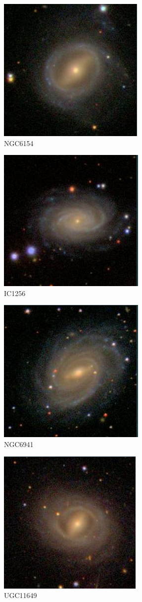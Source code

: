 \documentclass[9pt]{revtex4-1}
\begin{document}
\begin{figure}
\includegraphics[scale=0.3]{NGC6154.png}
\caption{NGC6154}
\end{figure}
\begin{figure}
\includegraphics[scale=0.3]{IC1256.png}
\caption{IC1256}
\end{figure}
\begin{figure}
\includegraphics[scale=0.3]{NGC6941.png}
\caption{NGC6941}
\end{figure}
\begin{figure}
\includegraphics[scale=0.3]{UGC11649.png}
\caption{UGC11649}
\end{figure}
\end{document}

